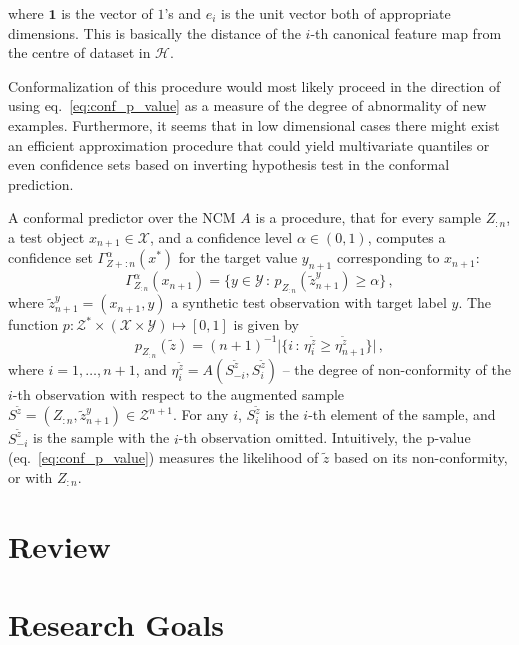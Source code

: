 \documentclass{extarticle}
\newcommand{\Hcal}{\mathcal{H}}
\newcommand{\Xcal}{\mathcal{X}}
\newcommand{\Ycal}{\mathcal{Y}}
\newcommand{\Zcal}{\mathcal{Z}}
\newcommand{\one}{\mathbf{1}}
\begin{document}
where $\one$ is the vector of $1$'s and $e_i$ is the unit vector both of appropriate
dimensions. This is basically the distance of the $i$-th canonical feature map from
the centre of dataset in $\Hcal$.

Conformalization of this procedure would most likely proceed in the direction of
using eq.~\ref{eq:conf_p_value} as a measure of the degree of abnormality of new
examples. Furthermore, it seems that in low dimensional cases there might exist an
efficient approximation procedure that could yield multivariate quantiles or even
confidence sets based on inverting hypothesis test in the conformal prediction.

A conformal predictor over the NCM $A$ is a procedure, that for every sample $Z_{:n}$,
a test object $x_{n+1} \in \Xcal$, and a confidence level $\alpha\in(0,1)$, computes
a confidence set $\Gamma_{Z+{:n}}^\alpha(x^*)$ for the target value $y_{n+1}$ corresponding
to $x_{n+1}$:
\begin{equation} \label{eq:conf_pred_set}
  \Gamma_{Z_{:n}}^\alpha(x_{n+1})
    = \bigl\{ y\in \Ycal \,:\, p_{Z_{:n}}(\tilde{z}^y_{n+1}) \geq \alpha \bigr\} \,,
\end{equation}
where $\tilde{z}^y_{n+1} = (x_{n+1}, y)$ a synthetic test observation with target
label $y$. The function $p:\Zcal^*\times (\Xcal\times \Ycal)\mapsto [0,1]$ is given
by
\begin{equation} \label{eq:conf_p_value}
  p_{Z_{:n}}(\tilde{z})
    = (n+1)^{-1} \bigl\lvert\{ i \,:\,
      \eta_i^{\tilde{z}} \geq \eta_{n+1}^{\tilde{z}} \}\bigr\rvert \,,
\end{equation}
where $i=1,\ldots, n+1$, and $\eta_i^{\tilde{z}} = A(S^{\tilde{z}}_{-i}, S^{\tilde{z}}_i)$
-- the degree of non-conformity of the $i$-th observation with respect to the augmented
sample $S^{\tilde{z}} = (Z_{:n}, {\tilde{z}}^y_{n+1}) \in \Zcal^{n+1}$. For any $i$,
$S^{\tilde{z}}_i$ is the $i$-th element of the sample, and $S^{\tilde{z}}_{-i}$ is
the sample with the $i$-th observation omitted. Intuitively, the p-value (eq.~\ref{eq:conf_p_value})
measures the likelihood of $\tilde{z}$ based on its non-conformity, or with $Z_{:n}$.



\section{Review} %
\label{sec:review}


\section{Research Goals} %
\label{sec:research_goals}


% 
\clearpage


\end{document}
